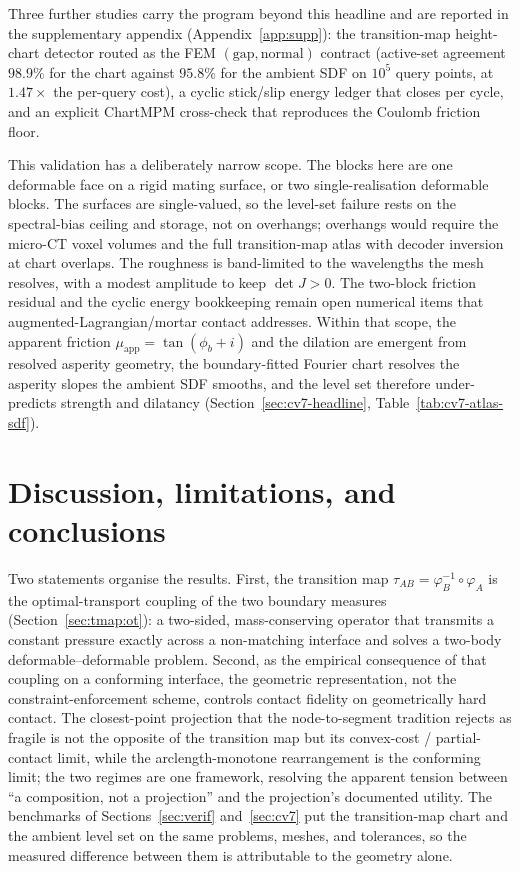 \documentclass{svjour3}                 %
\newcommand{\tmap}{\tau_{AB}}
\newcommand{\map}[1]{\varphi_{#1}}
\newcommand{\muapp}{\mu_{\mathrm{app}}}
\begin{document}
Three further studies carry the program beyond this headline and are reported in the supplementary appendix (Appendix~\ref{app:supp}): the transition-map height-chart detector routed as the FEM $(\text{gap},\text{normal})$ contract (active-set agreement $98.9\%$ for the chart against $95.8\%$ for the ambient SDF on $10^5$ query points, at $1.47\times$ the per-query cost), a cyclic stick/slip energy ledger that closes per cycle, and an explicit ChartMPM cross-check that reproduces the Coulomb friction floor.

This validation has a deliberately narrow scope. The blocks here are one deformable face on a rigid mating surface, or two single-realisation deformable blocks. The surfaces are single-valued, so the level-set failure rests on the spectral-bias ceiling and storage, not on overhangs; overhangs would require the micro-CT voxel volumes and the full transition-map atlas with decoder inversion at chart overlaps. The roughness is band-limited to the wavelengths the mesh resolves, with a modest amplitude to keep $\det J>0$. The two-block friction residual and the cyclic energy bookkeeping remain open numerical items that augmented-Lagrangian/mortar contact addresses. Within that scope, the apparent friction $\muapp=\tan(\phi_b+i)$ and the dilation are emergent from resolved asperity geometry, the boundary-fitted Fourier chart resolves the asperity slopes the ambient SDF smooths, and the level set therefore under-predicts strength and dilatancy (Section~\ref{sec:cv7-headline}, Table~\ref{tab:cv7-atlas-sdf}).

\section{Discussion, limitations, and conclusions}\label{sec:disc}

Two statements organise the results. First, the transition map $\tmap=\map{B}^{-1}\circ\map{A}$ is the
optimal-transport coupling of the two boundary measures (Section~\ref{sec:tmap:ot}): a two-sided,
mass-conserving operator that transmits a constant pressure exactly across a non-matching interface and solves a
two-body deformable--deformable problem. Second, as the empirical consequence of that coupling on a conforming interface,
the geometric representation, not the constraint-enforcement scheme, controls contact fidelity on
geometrically hard contact. The closest-point projection that the node-to-segment tradition rejects as fragile is
not the opposite of the transition map but its convex-cost / partial-contact limit, while the arclength-monotone
rearrangement is the conforming limit; the two regimes are one framework, resolving the apparent tension
between ``a composition, not a projection'' and the projection's documented utility. The benchmarks of
Sections~\ref{sec:verif} and~\ref{sec:cv7} put the
transition-map chart and the ambient level set on the same problems, meshes, and tolerances, so the measured
difference between them is attributable to the geometry alone.
\end{document}
